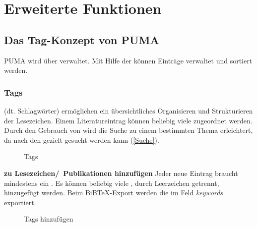 \chapter{Erweiterte Funktionen}
\section{Das Tag-Konzept von PUMA}
PUMA wird über \tags verwaltet. Mit Hilfe der \tags können Einträge verwaltet und sortiert werden.
\subsection{Tags}
\label{subsec:tags}
\tags{} (dt. Schlagwörter) ermöglichen ein übersichtliches Organisieren und Strukturieren der Lesezeichen. Einem Literatureintrag können beliebig viele \tags zugeordnet werden. Durch den Gebrauch von \tags wird die Suche zu einem bestimmten Thema erleichtert, da nach den \tags gezielt gesucht werden kann (\autoref{Suche}). \\
\begin{figure}[h!]
 \centering
 \caption{Tags}
 \label{figure025}
\end{figure}
\textbf{\tags zu Lesezeichen/~Publikationen hinzufügen}\newline
Jeder neue Eintrag braucht mindestens ein \tag. Es können beliebig viele \tags, durch Leerzeichen getrennt, hinzugefügt werden. Beim BiBTeX-Export werden die \tags im Feld \textit{keywords} exportiert.\\
\begin{figure}[h!]
 \centering
 \caption{Tags hinzufügen}
 \label{figure026}
\end{figure} 
